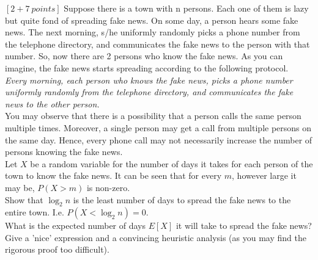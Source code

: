 \documentclass[12pt]{article}
\begin{document}
    \noindent
    
    \onehalfspace
  
  
  \begin{question}
    $[2+7\:points]$ Suppose there is a town with n persons.
    Each one of them is lazy but quite fond of spreading fake news. On
    some day, a person hears some fake news. The next morning, s/he uniformly randomly picks a phone number from the telephone directory,
    and communicates the fake news to the person with that number. So,
    now there are 2 persons who know the fake news. As you can imagine,
    the fake news starts spreading according to the following protocol.\vspace{5pt} \\
    \emph{Every morning, each person who knows the fake news, picks a phone
    number uniformly randomly from the telephone directory, and communicates the fake news to the other person.} \vspace{5pt} \\
    You may observe that there is a possibility that a person calls the
    same person multiple times. Moreover, a single person may get a call
    from multiple persons on the same day. Hence, every phone call may
    not necessarily increase the number of persons knowing the fake news.\\
    Let $X$ be a random variable for the number of days it takes for each
    person of the town to know the fake news. It can be seen that for every
    $m$, however large it may be, $P(X > m)$ is non-zero.\\
    Show that $\log_2 n$ is the least number of days to spread the fake news
    to the entire town. I.e. $P(X < \log_2 n) = 0$.\\
    What is the expected number of days $E[X]$ it will take to spread the
    fake news? Give a 'nice' expression and a convincing heuristic analysis
    (as you may find the rigorous proof too difficult).
  \end{question}
  
\end{document}
